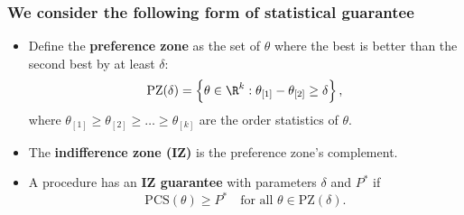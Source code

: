 \documentclass[13pt]{beamer}
\newcommand{\PZ}{\mathrm{PZ}}
\newcommand{\PCS}{\mathrm{PCS}}
\begin{document}
\begin{frame} \frametitle{We consider the following form of statistical guarantee}
\begin{itemize}
  \item Define the {\bf preference zone} as the set of $\theta$ where the best is better than the second best by at least $\delta$:
\begin{equation*}
  \PZ(\delta) = \left\{ \theta\in \R^k : \theta_{[1]} - \theta_{[2]} \ge \delta\right\},
\end{equation*}
where $\theta_{[1]} \ge \theta_{[2]} \ge \ldots \ge \theta_{[k]}$ are the order statistics of $\theta$.
\item The {\bf indifference zone (IZ)} is the preference zone's complement.
\item A procedure has an {\bf IZ guarantee} with parameters $\delta$ and $P^*$ if 
\begin{equation*}
  \PCS(\theta) \ge P^*
  \quad \text{for all $\theta\in \PZ(\delta)$}.
\end{equation*}
\end{itemize}
\end{frame}
\end{document}
